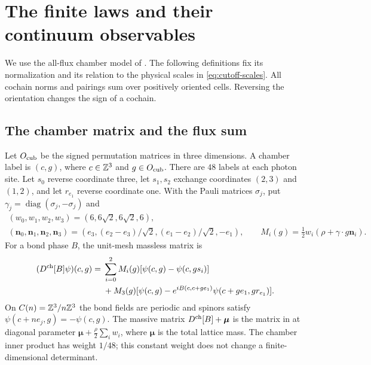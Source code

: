 \section{The finite laws and their continuum observables}\label{sec:regularization}

We use the all-flux chamber model of \cite[Section~2]{ChamberLattice}.
The following definitions fix its normalization and its relation to the
physical scales in \eqref{eq:cutoff-scales}. All cochain norms and
pairings sum over positively oriented cells. Reversing the orientation
changes the sign of a cochain.

\subsection{The chamber matrix and the flux sum}
Let $O_{\rm cub}$ be the signed permutation matrices in three dimensions.
A chamber label is $(c,g)$, where $c\in\mathbb Z^3$ and $g\in O_{\rm cub}$.
There are $48$ labels at each photon site. Let $s_0$ reverse coordinate
three, let $s_1,s_2$ exchange coordinates $(2,3)$ and $(1,2)$, and let
$r_{e_1}$ reverse coordinate one. With the Pauli matrices $\sigma_j$, put
$\gamma_j=\operatorname{diag}(\sigma_j,-\sigma_j)$ and
\[
 \begin{gathered}
 (w_0,w_1,w_2,w_3)=(6,6\sqrt2,6\sqrt2,6),\\
 (\mathbf n_0,\mathbf n_1,\mathbf n_2,\mathbf n_3)
 =(e_3,(e_2-e_3)/\sqrt2,(e_1-e_2)/\sqrt2,-e_1),\qquad
 M_i(g)=\tfrac12w_i(\rho+\gamma\cdot g\mathbf n_i).
 \end{gathered}
\]
For a bond phase $B$, the unit-mesh massless matrix is
\begin{equation}\label{eq:reg-dirac}
 \begin{split}
 (D^{\rm ch}[B]\psi)(c,g)={}&
 \sum_{i=0}^2M_i(g)[\psi(c,g)-\psi(c,gs_i)]\\
 &+M_3(g)[\psi(c,g)-e^{iB(c,c+ge_1)}
                         \psi(c+ge_1,gr_{e_1})].
 \end{split}
\end{equation}
On $C(n)=\mathbb Z^3/n\mathbb Z^3$ the bond fields are periodic and spinors
satisfy $\psi(c+ne_j,g)=-\psi(c,g)$. The massive matrix
$D^{\rm ch}[B]+\boldsymbol\mu$ is the matrix in
\cite[Section~2]{ChamberLattice} at diagonal parameter
$\boldsymbol\mu+\frac\rho2\sum_iw_i$, where $\boldsymbol\mu$ is
the total lattice mass. The chamber inner product has weight $1/48$;
this constant weight does not change a finite-dimensional determinant.


